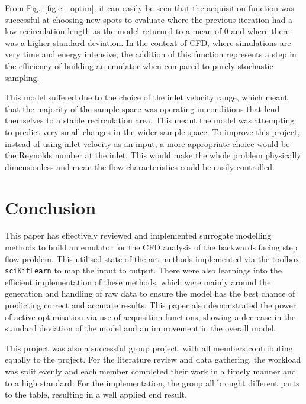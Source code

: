 \documentclass[conference]{IEEEtran}
\begin{document}
From Fig.~\ref{fig:ei_optim}, it can easily be seen that the acquisition function was successful at choosing new spots to evaluate where the previous iteration had a low recirculation length as the model returned to a mean of 0 and where there was a higher standard deviation. In the context of CFD, where simulations are very time and energy intensive, the addition of this function represents a step in the efficiency of building an emulator when compared to purely stochastic sampling.

This model suffered due to the choice of the inlet velocity range, which meant that the majority of the sample space was operating in conditions that lend themselves to a stable recirculation area. This meant the model was attempting to predict very small changes in the wider sample space. To improve this project, instead of using inlet velocity as an input, a more appropriate choice would be the Reynolds number at the inlet. This would make the whole problem physically dimensionless and mean the flow characteristics could be easily controlled.


\section{Conclusion}
This paper has effectively reviewed and implemented surrogate modelling methods to build an emulator for the CFD analysis of the backwards facing step flow problem. This utilised state-of-the-art methods implemented via the toolbox \texttt{sciKitLearn} to map the input to output. There were also learnings into the efficient implementation of these methods, which were mainly around the generation and handling of raw data to ensure the model has the best chance of predicting correct and accurate results. This paper also demonstrated the power of active optimisation via use of acquisition functions, showing a decrease in the standard deviation of the model and an improvement in the overall model.

This project was also a successful group project, with all members contributing equally to the project. For the literature review and data gathering, the workload was split evenly and each member completed their work in a timely manner and to a high standard. For the implementation, the group all brought different parts to the table, resulting in a well applied end result.


\clearpage
\printbibliography






\clearpage
\end{document}
